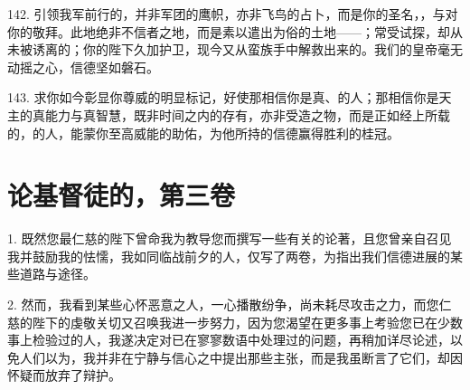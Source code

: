 142. 引领我军前行的，并非军团的鹰帜，亦非飞鸟的占卜，而是你的圣名，，与对你的敬拜。此地绝非不信者之地，而是素以遣出为俗的土地——；常受试探，却从未被诱离的；你的陛下久加护卫，现今又从蛮族手中解救出来的。我们的皇帝毫无动摇之心，信德坚如磐石。\par

143. 求你如今彰显你尊威的明显标记，好使那相信你是真、的人；那相信你是天主的真能力与真智慧，既非时间之内的存有，亦非受造之物，而是正如经上所载的，的人，能蒙你至高威能的助佑，为他所持的信德赢得胜利的桂冠。\par



\section{论基督徒的，第三卷}


\par

1. 既然您最仁慈的陛下曾命我为教导您而撰写一些有关的论著，且您曾亲自召见我并鼓励我的怯懦，我如同临战前夕的人，仅写了两卷，为指出我们信德进展的某些道路与途径。\par

2. 然而，我看到某些心怀恶意之人，一心播散纷争，尚未耗尽攻击之力，而您仁慈的陛下的虔敬关切又召唤我进一步努力，因为您渴望在更多事上考验您已在少数事上检验过的人，我遂决定对已在寥寥数语中处理过的问题，再稍加详尽论述，以免人们以为，我并非在宁静与信心之中提出那些主张，而是我虽断言了它们，却因怀疑而放弃了辩护。\par


